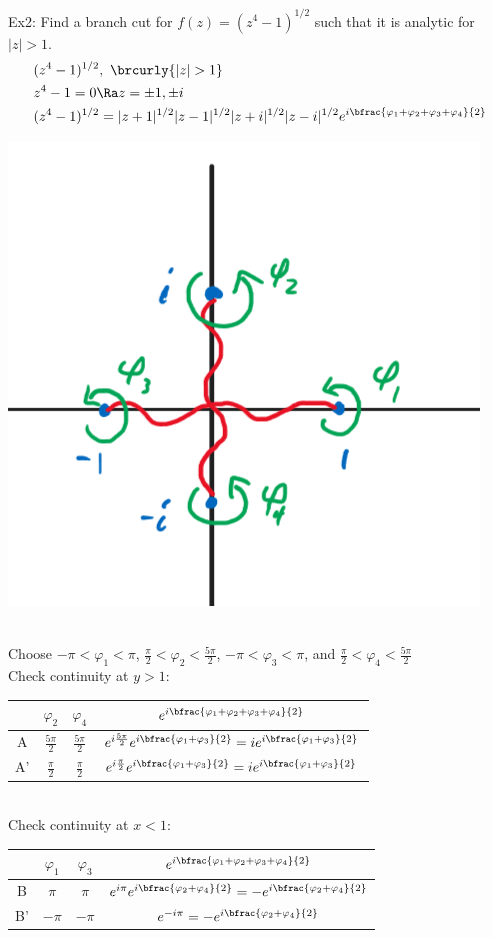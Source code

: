 Ex2: Find a branch cut for $f(z)=(z^4-1)^{1/2}$ such that it is analytic for $|z|>1$.
\begin{align*}
    &(z^4-1)^{1/2},\ \brcurly{|z|>1}\\
    &z^4-1=0\Ra z=\pm1,\pm i\\
    &(z^4-1)^{1/2}=|z+1|^{1/2}|z-1|^{1/2}|z+i|^{1/2}|z-i|^{1/2}e^{i\bfrac{\varphi_1+\varphi_2+\varphi_3+\varphi_4}{2}}
\end{align*}
\centerline{\includegraphics[scale=0.7]{Images/ComplexAnalysisPictures/2b.png}}\\
Choose $-\pi<\varphi_1<\pi$, $\frac{\pi}{2}<\varphi_2<\frac{5\pi}{2}$, $-\pi<\varphi_3<\pi$, and $\frac{\pi}{2}<\varphi_4<\frac{5\pi}{2}$\\
Check continuity at $y>1$:\\
\begin{tabular}{c|ccc}
     & $\varphi_2$ & $\varphi_4$ & $e^{i\bfrac{\varphi_1+\varphi_2+\varphi_3+\varphi_4}{2}}$\\
     \hline
     A & $\frac{5\pi}{2}$ & $\frac{5\pi}{2}$ & $e^{i\frac{5\pi}{2}}e^{i\bfrac{\varphi_1+\varphi_3}{2}}=ie^{i\bfrac{\varphi_1+\varphi_3}{2}}$\\
     A' & $\frac{\pi}{2}$ & $\frac{\pi}{2}$ & $e^{i\frac{\pi}{2}}e^{i\bfrac{\varphi_1+\varphi_3}{2}}=ie^{i\bfrac{\varphi_1+\varphi_3}{2}}$
\end{tabular}\\
Check continuity at $x<1$:\\
\begin{tabular}{c|ccc}
     & $\varphi_1$ & $\varphi_3$ & $e^{i\bfrac{\varphi_1+\varphi_2+\varphi_3+\varphi_4}{2}}$\\
     \hline
     B & $\pi$ & $\pi$ & $e^{i\pi}e^{i\bfrac{\varphi_2+\varphi_4}{2}}=-e^{i\bfrac{\varphi_2+\varphi_4}{2}}$\\
     B' & $-\pi$ & $-\pi$ & $e^{-i\pi}=-e^{i\bfrac{\varphi_2+\varphi_4}{2}}$
\end{tabular}

